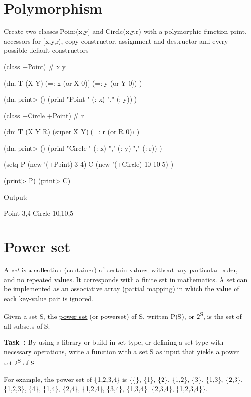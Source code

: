 \pagebreak{}
\section*{Polymorphism}

Create two classes Point(x,y) and Circle(x,y,r) with a polymorphic
function print, accessors for (x,y,r), copy constructor, assignment and
destructor and every possible default constructors

\begin{wideverbatim}

(class +Point)
# x y

(dm T (X Y)
   (=: x (or X 0))
   (=: y (or Y 0)) )

(dm print> ()
   (prinl "Point " (: x) "," (: y)) )

(class +Circle +Point)
# r

(dm T (X Y R)
   (super X Y)
   (=: r (or R 0)) )

(dm print> ()
   (prinl "Circle " (: x) "," (: y) "," (: r)) )


(setq
   P (new '(+Point) 3 4)
   C (new '(+Circle) 10 10 5) )

(print> P)
(print> C)

Output:

Point 3,4
Circle 10,10,5

\end{wideverbatim}

\pagebreak{}
\section*{Power set}

A \emph{set} is a collection (container) of certain values,
without any particular order, and no repeated values. It corresponds
with a finite set in mathematics. A set can be implemented as an
associative array (partial mapping) in which the value of each key-value
pair is ignored.

Given a set S, the \href{http://en.wikipedia.org/wiki/Power\_set}{power
set} (or powerset) of S, written P(S), or 2\textsuperscript{S}, is the
set of all subsets of S.

\textbf{Task~:} By using a library or build-in set type, or defining a
set type with necessary operations, write a function with a set S as
input that yields a power set 2\textsuperscript{S} of S.

For example, the power set of \{1,2,3,4\} is \{\{\}, \{1\}, \{2\},
\{1,2\}, \{3\}, \{1,3\}, \{2,3\}, \{1,2,3\}, \{4\}, \{1,4\}, \{2,4\},
\{1,2,4\}, \{3,4\}, \{1,3,4\}, \{2,3,4\}, \{1,2,3,4\}\}.


